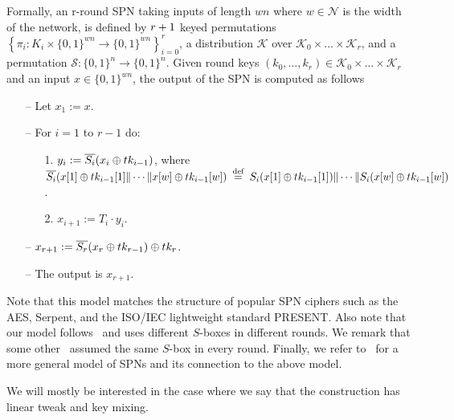 Formally, an r-round SPN taking inputs of length $w n$ where $w \in \mathcal{N}$ is the width of the network, is defined by $\mathnormal{r}+1$ keyed permutations $\left\{\pi_{i}: K_{i} \times\{0,1\}^{w n} \rightarrow\{0,1\}^{w n}\right\}_{i=0}^{r}$, a distribution $\mathcal{K}$ over $\mathcal{K}_{0} \times \dots \times \mathcal{K}_{r}$, and a permutation $\mathcal{S}:\{0,1\}^{n} \rightarrow \{0,1\}^{n}$. Given round keys $(k_{0},\dots, k_{r}) \in \mathcal{K}_{0} \times \dots \times \mathcal{K}_{r}$ and an input $x \in \{0,1\}^{w n}$, the output of the SPN is computed as follows

\begin{itemize}
  \item[--]
  Let $x_1 := x$.
  \item[--]
  For $i = 1$ to $r-1$ do:
  \begin{itemize}
  	\item[1.] $y_{i} := \overline{S_i}(x_{i}\oplus tk_{i-1})$, where $\overline{S_i}(x[1]\oplus tk_{i-1}[1]\|\cdots\| x[w]\oplus tk_{i-1}[w]) \stackrel{\text { def }}{=} S_i(x[1]\oplus tk_{i-1}[1])\|\cdots\| S_i(x[w]\oplus tk_{i-1}[w])$.
    \item[2.] 
    $x_{i + 1} := T_i\cdot y_i$.
  \end{itemize}
  \item[--] $x_{r+1} := \overline{S_r}(x_r\oplus tk_{r-1})\oplus tk_r$.
  \item[--]
  The output is $x_{r+1}$.
\end{itemize}

Note that this model matches the structure of popular SPN ciphers such as the AES, Serpent, and the ISO/IEC lightweight standard PRESENT. Also note that our model follows~\cite[Sect. 4.2]{C:CDKLST18} and uses different $S$-boxes in different rounds. We remark that some other~\cite[Sect. 3]{C:CDKLST18} assumed the same $S$-box in every round. Finally, we refer to~\cite[Sect. 2.1]{EPRINT:DKSTZ17} for a more general model of SPNs and its connection to the above model.



We will mostly be interested in the case where
we say that the construction has linear tweak and key mixing.




